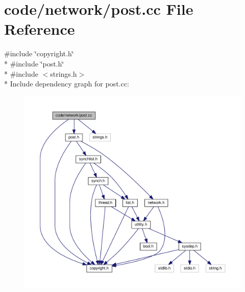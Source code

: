 \section{code/network/post.cc File Reference}
\label{post_8cc}
{\ttfamily \#include \char`\"{}copyright.\+h\char`\"{}}\\*
{\ttfamily \#include \char`\"{}post.\+h\char`\"{}}\\*
{\ttfamily \#include $<$strings.\+h$>$}\\*
Include dependency graph for post.\+cc\+:
\nopagebreak
\begin{figure}[H]
\begin{center}
\leavevmode
\includegraphics[width=350pt]{post_8cc__incl}
\end{center}
\end{figure}
